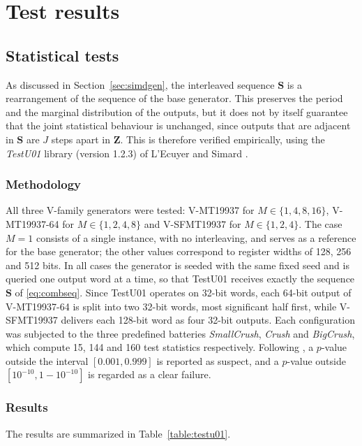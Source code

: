 \documentclass[preprint,1p,times]{elsarticle}
\begin{document}
\section{Test results}

\subsection{Statistical tests}
\label{sec:stats}
As discussed in Section~\ref{sec:simdgen}, the interleaved sequence $\boldsymbol{S}$ is a rearrangement of the sequence of the base generator. This preserves the period and the marginal distribution of the outputs, but it does not by itself guarantee that the joint statistical behaviour is unchanged, since outputs that are adjacent in $\boldsymbol{S}$ are $J$ steps apart in $\boldsymbol{Z}$. This is therefore verified empirically, using the \textit{TestU01} library (version 1.2.3) of L'Ecuyer and Simard \cite{testu01}.

\subsubsection{Methodology}
All three V-family generators were tested: V-MT19937 for $M \in \{1, 4, 8, 16\}$, V-MT19937-64 for $M \in \{1, 2, 4, 8\}$ and V-SFMT19937 for $M \in \{1, 2, 4\}$. The case $M=1$ consists of a single instance, with no interleaving, and serves as a reference for the base generator; the other values correspond to register widths of 128, 256 and 512 bits. In all cases the generator is seeded with the same fixed seed and is queried one output word at a time, so that TestU01 receives exactly the sequence $\boldsymbol{S}$ of \eqref{eq:combseq}. Since TestU01 operates on 32-bit words, each 64-bit output of V-MT19937-64 is split into two 32-bit words, most significant half first, while V-SFMT19937 delivers each 128-bit word as four 32-bit outputs. Each configuration was subjected to the three predefined batteries \textit{SmallCrush}, \textit{Crush} and \textit{BigCrush}, which compute 15, 144 and 160 test statistics respectively. Following \cite{testu01}, a $p$-value outside the interval $[0.001, 0.999]$ is reported as suspect, and a $p$-value outside $[10^{-10}, 1-10^{-10}]$ is regarded as a clear failure.

\subsubsection{Results}
The results are summarized in Table~\ref{table:testu01}.
\end{document}
